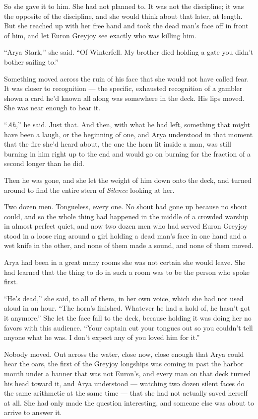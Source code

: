 So she gave it to him. She had not planned to. It was not the discipline; it was the opposite of the discipline, and she would think about that later, at length. But she reached up with her free hand and took the dead man’s face off in front of him, and let Euron Greyjoy see exactly who was killing him.

“Arya Stark,” she said. “Of Winterfell. My brother died holding a gate you didn’t bother sailing to.”

Something moved across the ruin of his face that she would not have called fear. It was closer to recognition — the specific, exhausted recognition of a gambler shown a card he’d known all along was somewhere in the deck. His lips moved. She was near enough to hear it.

“\textit{Ah,}” he said. Just that. And then, with what he had left, something that might have been a laugh, or the beginning of one, and Arya understood in that moment that the fire she’d heard about, the one the horn lit inside a man, was still burning in him right up to the end and would go on burning for the fraction of a second longer than he did.

Then he was gone, and she let the weight of him down onto the deck, and turned around to find the entire stern of \textit{Silence} looking at her.

\sceneBreak

Two dozen men. Tongueless, every one. No shout had gone up because no shout could, and so the whole thing had happened in the middle of a crowded warship in almost perfect quiet, and now two dozen men who had served Euron Greyjoy stood in a loose ring around a girl holding a dead man’s face in one hand and a wet knife in the other, and none of them made a sound, and none of them moved.

Arya had been in a great many rooms she was not certain she would leave. She had learned that the thing to do in such a room was to be the person who spoke first.

“He’s dead,” she said, to all of them, in her own voice, which she had not used aloud in an hour. “The horn’s finished. Whatever he had a hold of, he hasn’t got it anymore.” She let the face fall to the deck, because holding it was doing her no favors with this audience. “Your captain cut your tongues out so you couldn’t tell anyone what he was. I don’t expect any of you loved him for it.”

Nobody moved. Out across the water, close now, close enough that Arya could hear the oars, the first of the Greyjoy longships was coming in past the harbor mouth under a banner that was not Euron’s, and every man on that deck turned his head toward it, and Arya understood — watching two dozen silent faces do the same arithmetic at the same time — that she had not actually saved herself at all. She had only made the question interesting, and someone else was about to arrive to answer it.

